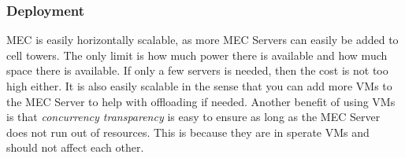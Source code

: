 \subsubsection{Deployment}
MEC is easily horizontally scalable, as more MEC Servers can easily be added to cell towers. The only limit is how much power there is available and how much space there is available. If only a few servers is needed, then the cost is not too high either. It is also easily scalable in the sense that you can add more VMs to the MEC Server to help with offloading if needed. Another benefit of using VMs is that \textit{concurrency transparency} is easy to ensure as long as the MEC Server does not run out of resources. This is because they are in sperate VMs and should not affect each other.








